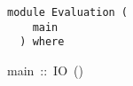\label{module:Evaluation}
\haddockbeginheader
{\haddockverb\begin{verbatim}
module Evaluation (
    main
  ) where\end{verbatim}}
\haddockendheader

\begin{haddockdesc}
\item[
main\ ::\ IO\ ()
]
\end{haddockdesc}